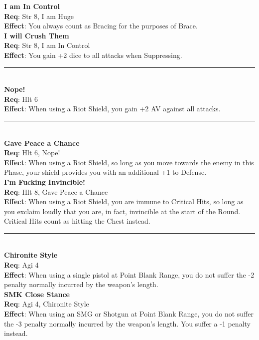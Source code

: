 \documentclass[a4paper, twocolumn, openany]{book}
\newlength{\indentlen}
\newcommand{\tabto}[1]{\setlength{\leftskip}{#1\indentlen}}
\begin{document}
{	\tabto{1}
	{\bfseries I am In Control}\\
	{\bfseries Req}:  Str 8, I am Huge\\
	{\bfseries Effect}: You always count as Bracing for the purposes of Brace.\\

		\tabto{2}
		{\bfseries I will Crush Them}\\
		{\bfseries Req}:  Str 8, I am In Control\\
		{\bfseries Effect}: You gain +2 dice to all attacks when Suppressing.\\ \hrule\ \\

\tabto{0}
{\bfseries Nope!}\\
{\bfseries Req}: Hlt 6\\
{\bfseries Effect}: When using a Riot Shield, you gain +2 AV against all attacks.\\ \hrule\ \\

\newpage %
	\tabto{1}
	{\bfseries Gave Peace a Chance}\\
	{\bfseries Req}: Hlt 6, Nope!\\
	{\bfseries Effect}: When using a Riot Shield, so long as you move towards the enemy in this
	Phase, your shield provides you with an additional +1 to Defense.\\

		\tabto{2}
		{\bfseries I’m Fucking Invincible!}\\
		{\bfseries Req}: Hlt 8, Gave Peace a Chance\\
		{\bfseries Effect}: When using a Riot Shield, you are immune to Critical Hits, so long as you
		exclaim loudly that you are, in fact, invincible at the start of the Round. Critical
		Hits count as hitting the Chest instead.\\ \hrule\ \\

\tabto{0}
{\bfseries Chironite Style}\\
{\bfseries Req}: Agi 4\\
{\bfseries Effect}: When using a single pistol at Point Blank Range, you do not suffer the -2 penalty
normally incurred by the weapon’s length.\\

	\tabto{1}
	{\bfseries SMK Close Stance}\\
	{\bfseries Req}: Agi 4, Chironite Style\\
	{\bfseries Effect}: When using an SMG or Shotgun at Point Blank Range, you do not suffer the -3
	penalty normally incurred by the weapon’s length. You suffer a -1 penalty instead.\\

}
\end{document}
